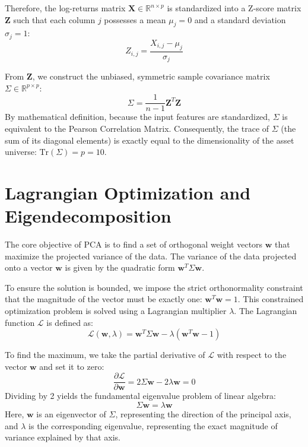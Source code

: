 \documentclass[12pt,twoside]{report}
\begin{document}
Therefore, the log-returns matrix $\mathbf{X} \in \mathbb{R}^{n \times p}$ is standardized into a Z-score matrix $\mathbf{Z}$ such that each column $j$ possesses a mean $\mu_j = 0$ and a standard deviation $\sigma_j = 1$:
\begin{equation}
    Z_{i,j} = \frac{X_{i,j} - \mu_j}{\sigma_j}
\end{equation}

From $\mathbf{Z}$, we construct the unbiased, symmetric sample covariance matrix $\Sigma \in \mathbb{R}^{p \times p}$:
\begin{equation}
    \Sigma = \frac{1}{n-1} \mathbf{Z}^T \mathbf{Z}
\end{equation}
By mathematical definition, because the input features are standardized, $\Sigma$ is equivalent to the Pearson Correlation Matrix. Consequently, the trace of $\Sigma$ (the sum of its diagonal elements) is exactly equal to the dimensionality of the asset universe: $\text{Tr}(\Sigma) = p = 10$.

\section{Lagrangian Optimization and Eigendecomposition}
The core objective of PCA is to find a set of orthogonal weight vectors $\mathbf{w}$ that maximize the projected variance of the data. The variance of the data projected onto a vector $\mathbf{w}$ is given by the quadratic form $\mathbf{w}^T \Sigma \mathbf{w}$.

To ensure the solution is bounded, we impose the strict orthonormality constraint that the magnitude of the vector must be exactly one: $\mathbf{w}^T \mathbf{w} = 1$. This constrained optimization problem is solved using a Lagrangian multiplier $\lambda$. The Lagrangian function $\mathcal{L}$ is defined as:
\begin{equation}
    \mathcal{L}(\mathbf{w}, \lambda) = \mathbf{w}^T \Sigma \mathbf{w} - \lambda(\mathbf{w}^T \mathbf{w} - 1)
\end{equation}

To find the maximum, we take the partial derivative of $\mathcal{L}$ with respect to the vector $\mathbf{w}$ and set it to zero:
\begin{equation}
    \frac{\partial \mathcal{L}}{\partial \mathbf{w}} = 2\Sigma \mathbf{w} - 2\lambda \mathbf{w} = 0
\end{equation}
Dividing by 2 yields the fundamental eigenvalue problem of linear algebra:
\begin{equation}
    \Sigma \mathbf{w} = \lambda \mathbf{w}
\end{equation}
Here, $\mathbf{w}$ is an eigenvector of $\Sigma$, representing the direction of the principal axis, and $\lambda$ is the corresponding eigenvalue, representing the exact magnitude of variance explained by that axis.
\end{document}
